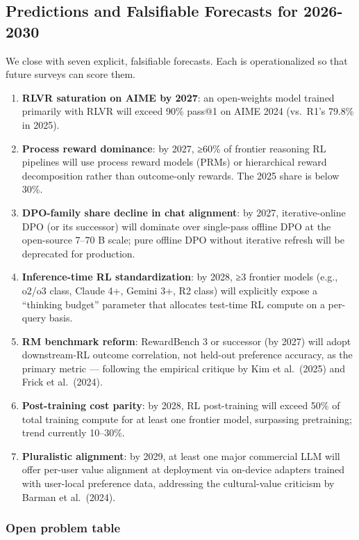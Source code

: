 \subsection{Predictions and Falsifiable Forecasts for 2026-2030}\label{predictions-and-falsifiable-forecasts-for-2026-2030}

We close with seven explicit, falsifiable forecasts. Each is operationalized so that future surveys can score them.

\begin{enumerate}
\def\labelenumi{\arabic{enumi}.}
\tightlist
\item
  \textbf{RLVR saturation on AIME by 2027}: an open-weights model trained primarily with RLVR will exceed 90\% pass@1 on AIME 2024 (vs.~R1's 79.8\% in 2025).
\item
  \textbf{Process reward dominance}: by 2027, ≥60\% of frontier reasoning RL pipelines will use process reward models (PRMs) or hierarchical reward decomposition rather than outcome-only rewards. The 2025 share is below 30\%.
\item
  \textbf{DPO-family share decline in chat alignment}: by 2027, iterative-online DPO (or its successor) will dominate over single-pass offline DPO at the open-source 7--70 B scale; pure offline DPO without iterative refresh will be deprecated for production.
\item
  \textbf{Inference-time RL standardization}: by 2028, ≥3 frontier models (e.g., o2/o3 class, Claude 4+, Gemini 3+, R2 class) will explicitly expose a ``thinking budget'' parameter that allocates test-time RL compute on a per-query basis.
\item
  \textbf{RM benchmark reform}: RewardBench 3 or successor (by 2027) will adopt downstream-RL outcome correlation, not held-out preference accuracy, as the primary metric --- following the empirical critique by Kim et al.~(2025) and Frick et al.~(2024).
\item
  \textbf{Post-training cost parity}: by 2028, RL post-training will exceed 50\% of total training compute for at least one frontier model, surpassing pretraining; trend currently 10--30\%.
\item
  \textbf{Pluralistic alignment}: by 2029, at least one major commercial LLM will offer per-user value alignment at deployment via on-device adapters trained with user-local preference data, addressing the cultural-value criticism by Barman et al.~(2024).
\end{enumerate}

\subsubsection{Open problem table}\label{open-problem-table}

